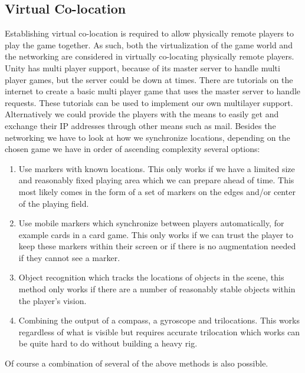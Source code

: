 \subsection{Virtual Co-location} \label{sec:virtualcolocation}
	Establishing virtual co-location is required to allow physically remote
	players to play the game together. As such, both the virtualization of the
	game world and the networking are considered in virtually co-locating
	physically remote players. Unity has multi player support, because of its
	master server to handle multi player games, but the server could be down at
	times. There are tutorials on the internet to create a basic multi player game
	that uses the master server to handle requests. These tutorials can be used to
	implement our own multilayer support. Alternatively we could provide the
	players with the means to easily get and exchange their IP addresses through
	other means such as mail. Besides the networking we have to look at how we
	synchronize locations, depending on the chosen game we have in order of
	ascending complexity several options:

	\begin{enumerate}
		\item Use markers with known locations. This only works if we have a limited
		      size and reasonably fixed playing area which we can prepare ahead of
					time. This most likely comes in the form of a set of markers on the
					edges and/or center of the playing field.
		\item Use mobile markers which synchronize between players automatically, for
		      example cards in a card game. This only works if we can trust the
					player to keep these markers within their screen or if there is no
					augmentation needed if they cannot see a marker.
		\item Object recognition which tracks the locations of objects in the scene,
		      this method only works if there are a number of reasonably stable
					objects within the player's vision.
		\item Combining the output of a compass, a gyroscope and trilocations. This
		      works regardless of what is visible but requires accurate trilocation
					which works can be quite hard to do without building a heavy rig.
	\end{enumerate}
	Of course a combination of several of the above methods is also possible.

